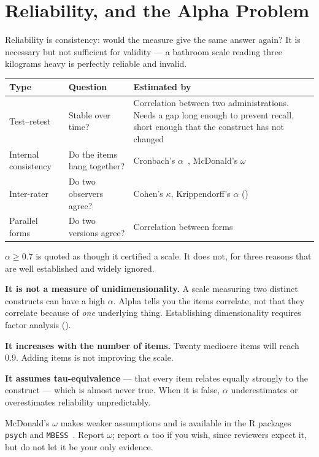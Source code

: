 \section{Reliability, and the Alpha Problem}

Reliability is consistency: would the measure give the same answer again? It is
necessary but not sufficient for validity --- a bathroom scale reading three
kilograms heavy is perfectly reliable and invalid.

\begin{center}
\small
\begin{tabular}{@{}L{3.2cm}L{5.0cm}L{6.1cm}@{}}
\toprule
\textbf{Type} & \textbf{Question} & \textbf{Estimated by} \\
\midrule
Test--retest       & Stable over time?
                   & Correlation between two administrations. Needs a gap long
                     enough to prevent recall, short enough that the construct
                     has not changed \\
Internal consistency & Do the items hang together?
                   & Cronbach's $\alpha$~\cite{cronbach1951coefficient},
                     McDonald's $\omega$ \\
Inter-rater        & Do two observers agree?
                   & Cohen's $\kappa$, Krippendorff's $\alpha$
                     () \\
Parallel forms     & Do two versions agree?
                   & Correlation between forms \\
\bottomrule
\end{tabular}
\end{center}

\begin{alertbox}
$\alpha \ge 0.7$ is quoted as though it certified a scale. It does not, for
three reasons that are well established and widely ignored.

\medskip
\textbf{It is not a measure of unidimensionality.} A scale measuring two
distinct constructs can have a high $\alpha$. Alpha tells you the items
correlate, not that they correlate because of \emph{one} underlying thing.
Establishing dimensionality requires factor analysis ().

\medskip
\textbf{It increases with the number of items.} Twenty mediocre items will
reach 0.9. Adding items is not improving the scale.

\medskip
\textbf{It assumes tau-equivalence} --- that every item relates equally
strongly to the construct --- which is almost never true. When it is false,
$\alpha$ underestimates or overestimates reliability unpredictably.

\medskip
McDonald's $\omega$ makes weaker assumptions and is available in the R packages
\texttt{psych} and \texttt{MBESS}~\cite{revelle2009coefficients}. Report
$\omega$; report $\alpha$ too if you wish, since reviewers expect it, but do not
let it be your only evidence.
\end{alertbox}

